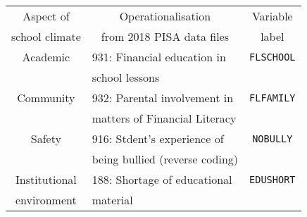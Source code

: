 \begin{table}
  \centering
    \begin{tabular}{clc}
    \toprule
    Aspect of      & \multicolumn{1}{c}{Operationalisation} & Variable \\
    school climate & \multicolumn{1}{c}{from 2018 PISA data files} & label \\
    \midrule
    Academic & 931: Financial education in & \texttt{FLSCHOOL} \\
             & school lessons              & \\
    Community & 932: Parental involvement in & \texttt{FLFAMILY} \\
              & matters of Financial Literacy & \\
    Safety & 916: Stdent's experience of & \texttt{NOBULLY} \\
           & being bullied (reverse coding) & \\
    Institutional & 188: Shortage of educational & \texttt{EDUSHORT} \\
    environment   & material                     & \\
    \bottomrule
    \end{tabular}
\end{table}
